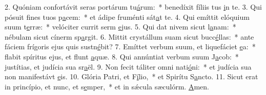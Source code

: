 2. Quóniam confortávit seras portárum tu\uline{á}rum:~* benedíxit fíliis tus \uline{i}n te.
3. Qui pósuit fines tuos p\uline{a}cem:~* et ádipe fruménti sát\uline{a}t te.
4. Qui emíttit elóquium suum t\uline{e}rræ:~* velóciter currit serm \uline{e}jus.
5. Qui dat nivem sicut l\uline{a}nam:~* nébulam sicut cínerm sp\uline{a}rgit.
6. Mittit crystállum suam sicut bucc\uline{é}llas:~* ante fáciem frígoris ejus quis sustn\uline{é}bit?
7. Emíttet verbum suum, et liquefáciet \uline{e}a:~* flabit spíritus ejus, et flunt \uline{a}quæ.
8. Qui annúntiat verbum suum J\uline{a}cob:~* justítias, et judícia sua sr\uline{a}ël.
9. Non fecit táliter omni nati\uline{ó}ni:~* et judícia sua non manifestávt \uline{e}is.
10. Glória Patri, et F\uline{í}lio,~* et Spirítu S\uline{a}ncto.
11. Sicut erat in princípio, et nunc, et s\uline{e}mper,~* et in sǽcula sæculórm. \uline{A}men.
